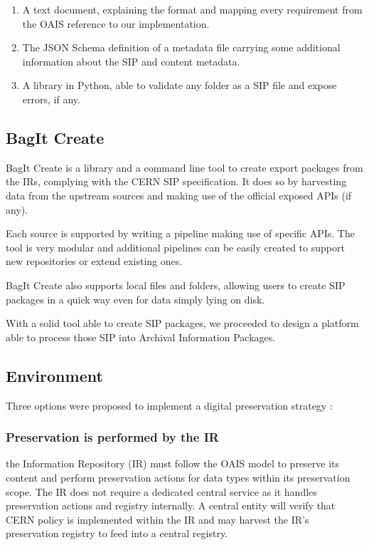 \documentclass[11pt]{IEEEtran}
\begin{document}
\begin{enumerate}
    \item A text document, explaining the format and mapping every requirement from the OAIS reference to our implementation.
    \item The JSON Schema definition of a metadata file carrying some additional information about the SIP and content metadata.
    \item A library in Python, able to validate any folder as a SIP file and expose errors, if any.
\end{enumerate}

\subsection{BagIt Create}

BagIt Create is a library and a command line tool to create export packages from the IRs, complying with the CERN SIP specification. It does so by harvesting data from the upstream sources and making use of the official exposed APIs (if any).

Each source is supported by writing a pipeline making use of specific APIs. The tool is very modular and additional pipelines can be easily created to support new repositories or extend existing ones.

BagIt Create also supports local files and folders, allowing users to create SIP packages in a quick way even for data simply lying on disk.

With a solid tool able to create SIP packages, we proceeded to design a platform able to process those SIP into Archival Information Packages.

\subsection{Environment}

Three options were proposed to implement a digital preservation strategy\cite{strategy} :

\subsubsection{Preservation is performed by the IR} the Information Repository (IR) must follow the OAIS model to preserve its content and perform preservation actions for data types within its preservation scope. The IR does not require a dedicated central service as it handles preservation actions and registry internally. A central entity will verify that CERN policy is implemented within the IR and may harvest the IR's preservation registry to feed into a central registry.
\end{document}
